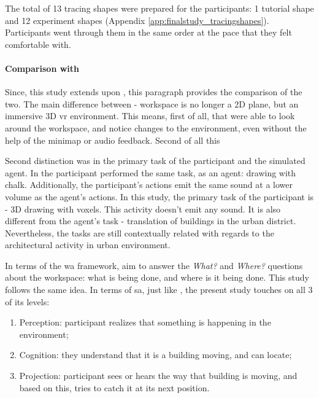 The total of 13 tracing shapes were prepared for the participants: 1 tutorial shape and 12 experiment shapes (Appendix \ref{app:finalstudy_tracingshapes}).
Participants went through them in the same order at the pace that they felt comfortable with.

\paragraph{Comparison with }
Since, this study extends upon \cite{gutwin_chalk_2011}, this paragraph provides the comparison of the two.
The main difference between - workspace is no longer a 2D plane, but an immersive 3D \gls{vr} environment. This means, first of all, that were able to look around the workspace, and notice changes to the environment, even without the help of the minimap or audio feedback. 
Second of all this 

Second distinction was in the primary task of the participant and the simulated agent. In \cite{gutwin_chalk_2011} the participant performed the same task, as an agent: drawing with chalk. Additionally, the participant's actions emit the same sound at a lower volume as the agent's actions. In this study, the primary task of the participant is - 3D drawing with voxels. This activity doesn't emit any sound. It is also different from the agent's task - translation of buildings in the urban district. Nevertheless, the tasks are still contextually related with regards to the architectural activity in urban environment.

In terms of the \gls{wa} framework, \cite{gutwin_chalk_2011} aim to answer the \textit{What?} and \textit{Where?} questions about the workspace: what is being done, and where is it being done. This study follows the same idea. In terms of \gls{sa}, just like \cite{gutwin_chalk_2011}, the present study touches on all 3 of its levels: 
\begin{enumerate}
	\item Perception: participant realizes that something is happening in the environment;
	\item Cognition: they understand that it is a building moving, and can locate;
	\item Projection: participant sees or hears the way that building is moving, and based on this, tries to catch it at its next position.
\end{enumerate}


